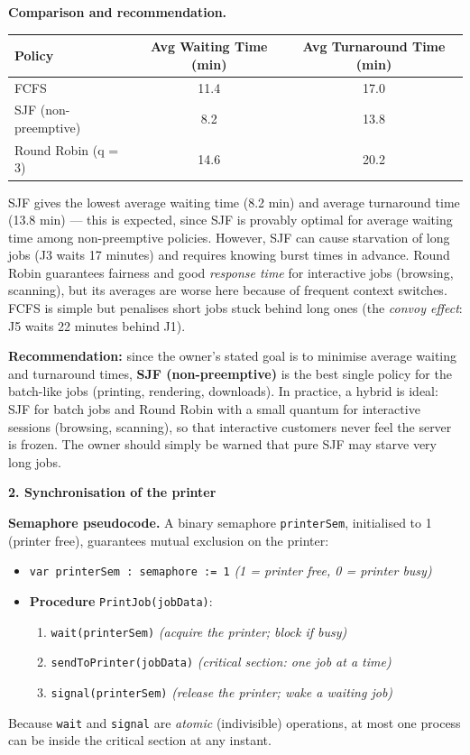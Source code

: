 \documentclass[11pt]{article}
\newcommand{\cle}[1]{{\popxbold\color{popdark}#1}}
\begin{document}
\textbf{Comparison and recommendation.}\par

\begin{center}
\begin{tabular}{|l|c|c|}
\hline
\rowcolor{popblueL}
\textbf{Policy} & \textbf{Avg Waiting Time (min)} & \textbf{Avg Turnaround Time (min)} \\
\hline
FCFS & 11.4 & 17.0 \\
\hline
SJF (non-preemptive) & 8.2 & 13.8 \\
\hline
Round Robin (q = 3) & 14.6 & 20.2 \\
\hline
\end{tabular}
\end{center}

SJF gives the lowest average waiting time (8.2 min) and average turnaround time (13.8 min) — this is expected, since SJF is provably optimal for average waiting time among non-preemptive policies. However, SJF can cause \cle{starvation} of long jobs (J3 waits 17 minutes) and requires knowing burst times in advance. Round Robin guarantees fairness and good \emph{response time} for interactive jobs (browsing, scanning), but its averages are worse here because of frequent context switches. FCFS is simple but penalises short jobs stuck behind long ones (the \emph{convoy effect}: J5 waits 22 minutes behind J1).

\textbf{Recommendation:} since the owner's stated goal is to minimise average waiting and turnaround times, \textbf{SJF (non-preemptive)} is the best single policy for the batch-like jobs (printing, rendering, downloads). In practice, a hybrid is ideal: SJF for batch jobs and Round Robin with a small quantum for interactive sessions (browsing, scanning), so that interactive customers never feel the server is frozen. The owner should simply be warned that pure SJF may starve very long jobs.

\textbf{2. Synchronisation of the printer}\par

\textbf{Semaphore pseudocode.} A binary semaphore \texttt{printerSem}, initialised to 1 (printer free), guarantees mutual exclusion on the printer:
\begin{itemize}
    \item \texttt{var printerSem : semaphore := 1}  \emph{(1 = printer free, 0 = printer busy)}
    \item \textbf{Procedure} \texttt{PrintJob(jobData)}:
    \begin{enumerate}
        \item \texttt{wait(printerSem)}  \emph{(acquire the printer; block if busy)}
        \item \texttt{sendToPrinter(jobData)}  \emph{(critical section: one job at a time)}
        \item \texttt{signal(printerSem)}  \emph{(release the printer; wake a waiting job)}
    \end{enumerate}
\end{itemize}
Because \texttt{wait} and \texttt{signal} are \emph{atomic} (indivisible) operations, at most one process can be inside the critical section at any instant.
\end{document}
